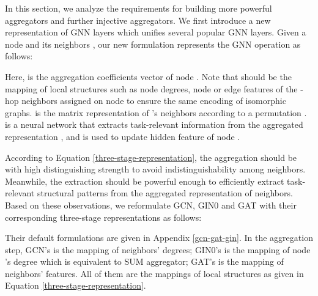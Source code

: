\documentclass{article} \usepackage{iclr2021_conference,times}
\begin{document}
In this section,
we analyze the requirements for building more powerful aggregators and further injective aggregators.
We first introduce a new representation of GNN layers which unifies several popular GNN layers.
Given a node  and its neighbors ,
our new formulation represents the GNN operation as follows:

Here,  is the aggregation coefficients vector of node .
Note that  should be the mapping of local structures such as node degrees, node or edge features of the -hop neighbors assigned on node  to ensure the same encoding of isomorphic graphs.
 is the matrix representation of 's neighbors according to a permutation .
 is a neural network that extracts task-relevant information from the aggregated representation , and is used to update hidden feature  of node .

According to Equation \ref{three-stage-representation}, the aggregation should be with high distinguishing strength to avoid indistinguishability among neighbors.
Meanwhile, the extraction should be powerful enough to efficiently extract task-relevant structural patterns from the aggregated representation of neighbors.
Based on these observations, we reformulate GCN, GIN0 and GAT with their corresponding three-stage representations as follows:
\begin{small}

\end{small}
\begin{small}

\end{small}
Their default formulations are given in Appendix \ref{gcn-gat-gin}.
In the aggregation step,
GCN's  is the mapping of neighbors' degrees;
GIN0's  is the mapping of node 's degree which is equivalent to SUM aggregator;
GAT's  is the mapping of neighbors' features.
All of them are the mappings of local structures as given in Equation \ref{three-stage-representation}.
\end{document}
